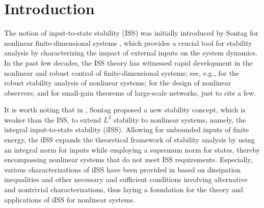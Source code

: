 \documentclass[onecolumn]{autart}
\newenvironment{proof of Prop.ODE}{{\it Proof of Proposition~\ref{Prop.ODE}:\enspace}}{\hfill $\blacksquare$\par}
\newenvironment{proof of PDE}{{\it Proof of Proposition \ref{Prop.8}:\enspace}}{\hfill $\blacksquare$\par}
\begin{document}
\section{Introduction}\label{sec1}

The notion of input-to-state stability (ISS)   was initially introduced  by Sontag for nonlinear finite-dimensional  systems \cite{sontag1990further}, which provides a crucial tool for stability analysis   by characterizing  the impact of external inputs on the  system dynamics.
In the past few decades,   the ISS  theory has witnessed rapid development in the  nonlinear and robust control of finite-dimensional systems; see, e.g.,    \cite{Aghaeeyan2020,freeman2008robust,Khalil2001non,zhu2020} for the robust stability analysis of nonlinear systems;  \cite{andrieu2009unifying,arcak2001nonlinear,chen2012CNSNS,zhuang2025} for the design of nonlinear observers;  and \cite{dashkovskiy2007iss,dashkovskiy2010small,jiang1994small} for
small-gain theorems  of large-scale networks,   just to cite a few.

It is worth noting that  in \cite{sontag1998comments}, Sontag   proposed a new stability concept, which is weaker than the ISS,  to extend $L^2$ stability to nonlinear systems, namely, the  integral input-to-state stability (iISS). Allowing for unbounded inputs of finite energy, the iISS expands the theoretical framework of   stability analysis by using an integral norm for inputs while employing a supremum norm   for states,  thereby encompassing nonlinear systems that do not meet ISS requirements.
Especially,
various characterizations of iISS  have been provided in \cite{angeli2000IEEETAC} based on dissipation inequalities and other necessary and sufficient conditions involving alternative and nontrivial characterizations, thus laying a foundation for the theory and applications of iISS for nonlinear systems.%
\end{document}
